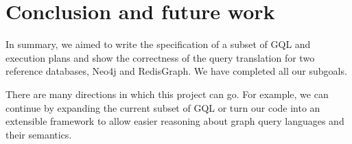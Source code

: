 \documentclass[14pt]{constructor-thesis}
\theoremstyle{definition}
\begin{document}
\section*{Conclusion and future work}

In summary, we aimed to write the specification of a subset of GQL and execution plans and show the correctness of the query translation for two reference databases, Neo4j and RedisGraph. We have completed all our subgoals.

There are many directions in which this project can go. For example, we can continue by expanding the current subset of GQL or turn our code into an extensible framework to allow easier reasoning about graph query languages and their semantics.

\setmonofont[Mapping=tex-text]{CMU Typewriter Text}
% 
% 
\printbibliography
\end{document}
